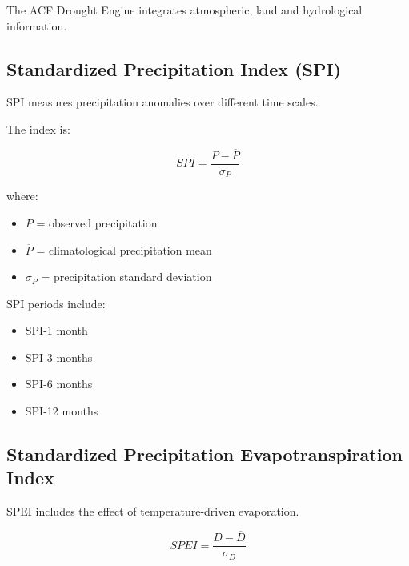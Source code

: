 The ACF Drought Engine integrates atmospheric, land and hydrological
information.


\subsection{Standardized Precipitation Index (SPI)}

SPI measures precipitation anomalies over different time scales.

The index is:

\[
SPI=
\frac{P-\overline{P}}
{\sigma_P}
\]


where:

\begin{itemize}

\item $P$ = observed precipitation

\item $\overline{P}$ = climatological precipitation mean

\item $\sigma_P$ = precipitation standard deviation

\end{itemize}


SPI periods include:

\begin{itemize}

\item SPI-1 month

\item SPI-3 months

\item SPI-6 months

\item SPI-12 months

\end{itemize}



\subsection{Standardized Precipitation Evapotranspiration Index}

SPEI includes the effect of temperature-driven evaporation.

\[
SPEI=
\frac{D-\overline{D}}
{\sigma_D}
\]


